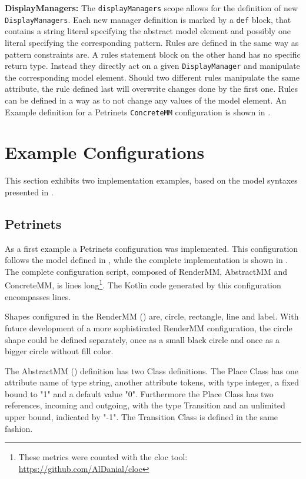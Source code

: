 \textbf{DisplayManagers:} The \texttt{displayManagers} scope allows for the definition of new \texttt{DisplayManagers}. Each new manager definition is marked by a \texttt{def} block, that contains a string literal specifying the abstract model element and possibly one literal specifying the corresponding pattern. 
Rules are defined in the same way as pattern constraints are. A rules statement block on the other hand has no specific return type. Instead they directly act on a given \texttt{DisplayManager} and manipulate the corresponding model element. Should two different rules manipulate the same attribute, the rule defined last will overwrite changes done by the first one. Rules can be defined in a way as to not change any values of the model element. An Example definition for a Petrinets \texttt{ConcreteMM} configuration is shown in .

\section{Example Configurations}
\label{sec:example-configs}
This section exhibits two implementation examples, based on the model syntaxes presented in .

\subsection{Petrinets}
\label{sec:petri-impl}
As a first example a Petrinets configuration was implemented. This configuration follows the model defined in , while the complete implementation is shown in . The complete configuration script, composed of RenderMM, AbstractMM and ConcreteMM, is \petriConfigLoC lines long\footnote{These metrics were counted with the cloc tool: \url{https://github.com/AlDanial/cloc}}. The Kotlin code generated by this configuration encompasses \petriGeneratedLoC lines. 

Shapes configured in the RenderMM () are, circle, rectangle, line and label. With future development of a more sophisticated RenderMM configuration, the circle shape could be defined separately, once as a small black circle and once as a bigger circle without fill color. 

The AbstractMM () definition has two Class definitions. The Place Class has one attribute name of type string, another attribute tokens, with type integer, a fixed bound to "1" and a default value "0". Furthermore the Place Class has two references, incoming and outgoing, with the type Transition and an unlimited upper bound, indicated by "-1". The Transition Class is defined in the same fashion.


